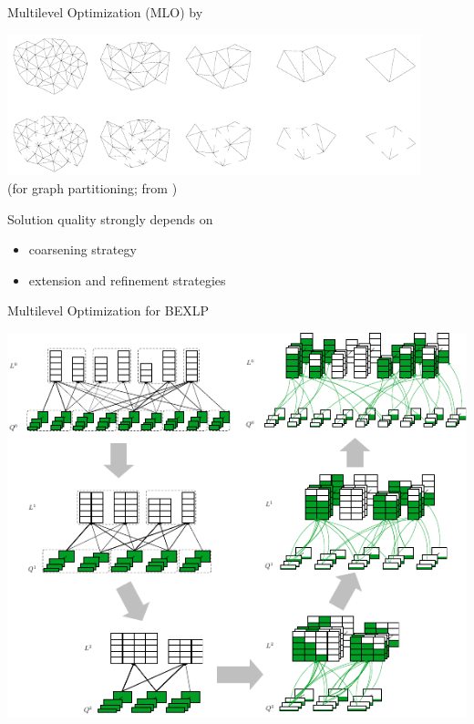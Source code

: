 \documentclass[aspectratio=1610]{beamer}
\newcommand{\important}[1]{{\color{green!60!black}#1}}
\begin{document}
\begin{frame}{Multilevel Optimization (MLO) by \citet{walshaw-04}}
	\begin{center}
		\includegraphics[width=0.9\textwidth]{graphics/mlr-gpp.png}\\
		{\small (for graph partitioning; from \citet{walshaw-04})}
	\end{center}

\important{Solution quality strongly depends on}
\begin{itemize}
	\item coarsening strategy
	\item extension and refinement strategies
\end{itemize}
\end{frame}

\begin{frame}{Multilevel Optimization for BEXLP}
\begin{center}
	\includegraphics[scale=1.0]{graphics/MLR_example.pdf}
\end{center}
\end{frame}	
\end{document}
